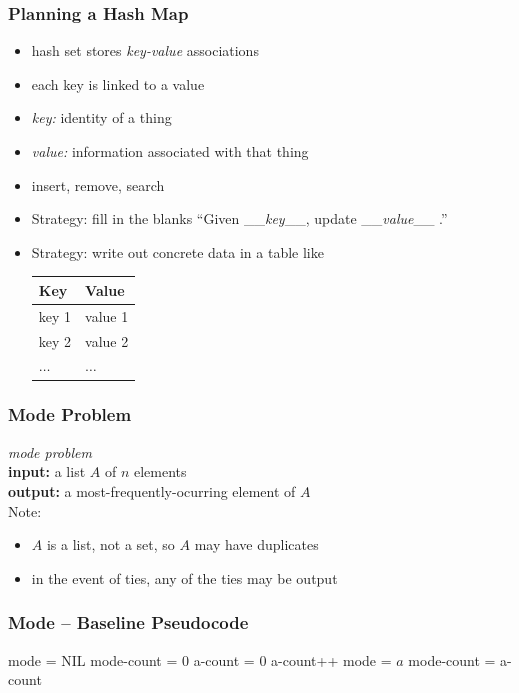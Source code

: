 \documentclass[10pt,aspectratio=169]{beamer}
\begin{document}
\begin{frame} \frametitle{Planning a Hash Map}
\begin{itemize}
  \item hash set stores \emph{key-value} associations
  \item each key is linked to a value
  \item \emph{key:} identity of a thing
  \item \emph{value:} information associated with that thing
  \item insert, remove, search
  \item Strategy: fill in the blanks ``Given \_\_\emph{key}\_\_, update \_\_\emph{value}\_\_ .''
  \item Strategy: write out concrete data in a table like
  \begin{center}
    \begin{tabular}{ll}
      \textbf{Key} & \textbf{Value} \\ \hline
      key 1 & value 1 \\
      key 2 & value 2 \\
      $\ldots$ & $\ldots$ 
    \end{tabular}
  \end{center}
\end{itemize}
\end{frame}


\begin{frame} \frametitle{Mode Problem}
  \emph{mode problem} \\
  \textbf{input:} a list $A$ of $n$ elements\\
  \textbf{output:} a most-frequently-ocurring element of $A$ \\

  \vspace{24pt}
  Note:
  \begin{itemize}
    \item $A$ is a list, not a set, so $A$ may have duplicates
    \item in the event of ties, any of the ties may be output
  \end{itemize}
\end{frame}


\begin{frame} \frametitle{Mode -- Baseline Pseudocode}
  {\footnotesize
  \begin{algorithmic}[1]
    \State mode = NIL
    \State mode-count = 0
      \State a-count = 0
          \State a-count++
        \EndIf
      \EndFor
        \State mode = $a$
        \State mode-count = a-count
      \EndIf
    \EndFor
    \State {}
    \EndFunction
  \end{algorithmic}
  }
\end{frame}
\end{document}
